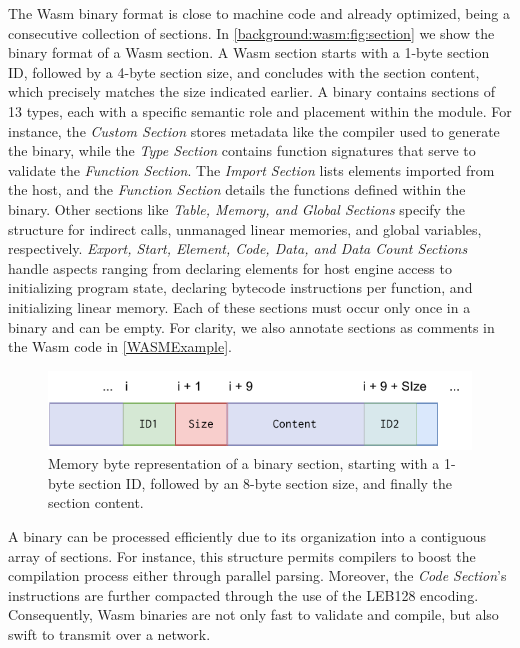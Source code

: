 The Wasm binary format is close to machine code and already optimized, being a consecutive collection of sections.
In \autoref{background:wasm:fig:section} we show the binary format of a Wasm section.
A Wasm section starts with a 1-byte section ID, followed by a 4-byte section size, and concludes with the section content, which precisely matches the size indicated earlier.
A \Wasm binary contains sections of 13 types, each with a specific semantic role and placement within the module. 
For instance, the \emph{Custom Section} stores metadata like the compiler used to generate the binary, while the \emph{Type Section} contains function signatures that serve to validate the \emph{Function Section}. 
The \emph{Import Section} lists elements imported from the host, and the \emph{Function Section} details the functions defined within the binary. 
Other sections like \emph{Table, Memory, and Global Sections} specify the structure for indirect calls, unmanaged linear memories, and global variables, respectively. 
\emph{Export, Start, Element, Code, Data, and Data Count Sections} handle aspects ranging from declaring elements for host engine access to initializing program state, declaring bytecode instructions per function, and initializing linear memory. 
Each of these sections must occur only once in a binary and can be empty.
For clarity, we also annotate sections as comments in the Wasm code in \autoref{WASMExample}.
    

\begin{figure}[h]
    \centering
    \includegraphics[width=0.5\linewidth]{figures/section.pdf}
    \caption{Memory byte representation of a \Wasm binary section, starting with a 1-byte section ID, followed by an 8-byte section size, and finally the section content.}
    \label{background:wasm:fig:section}
\end{figure}

A \Wasm binary can be processed efficiently due to its organization into a contiguous array of sections. 
For instance, this structure permits compilers to boost the compilation process either through parallel parsing. 
Moreover, the \emph{Code Section}'s instructions are further compacted through the use of the LEB128 encoding. 
Consequently, Wasm binaries are not only fast to validate and compile, but also swift to transmit over a network.

